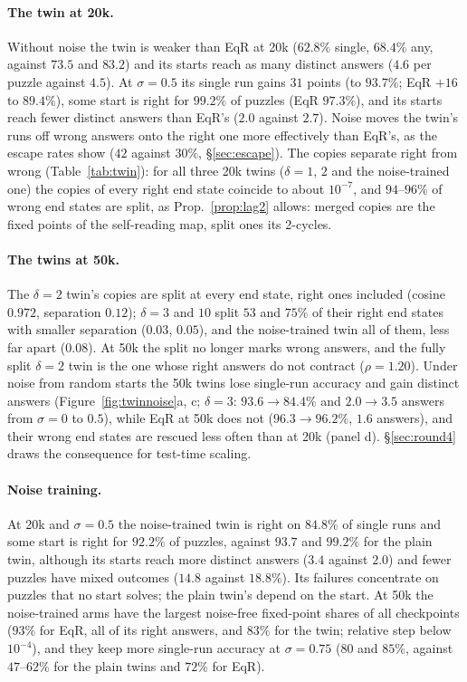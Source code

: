 \documentclass[11pt]{article}
\theoremstyle{definition}
\begin{document}
\paragraph{The twin at 20k.} Without noise the twin is weaker than EqR at 20k ($62.8\%$ single, $68.4\%$ any, against $73.5$ and $83.2$) and
its starts reach as many distinct answers ($4.6$ per puzzle against $4.5$). At $\sigma=0.5$ its single run gains $31$ points (to $93.7\%$; EqR
$+16$ to $89.4\%$), some start is right for $99.2\%$ of puzzles (EqR $97.3\%$), and its starts reach fewer distinct answers than EqR's ($2.0$
against $2.7$). Noise moves the twin's runs off wrong answers onto the right one more effectively than EqR's, as the escape rates show
($42$ against $30\%$, \S\ref{sec:escape}). The copies separate right from wrong (Table~\ref{tab:twin}): for all three 20k twins ($\delta=1$, $2$
and the noise-trained one) the copies of every right end state coincide to about $10^{-7}$, and $94$--$96\%$ of wrong end states are split,
as Prop.~\ref{prop:lag2} allows: merged copies are the fixed points of the self-reading map, split ones its 2-cycles.

\paragraph{The twins at 50k.} The $\delta=2$ twin's copies are split at every end state, right ones included (cosine $0.972$, separation $0.12$);
$\delta=3$ and $10$ split $53$ and $75\%$ of their right end states with smaller separation ($0.03$, $0.05$), and the noise-trained twin all of
them, less far apart ($0.08$). At 50k the split no longer marks wrong answers, and the fully split $\delta=2$ twin is the one whose right
answers do not contract ($\rho=1.20$). Under noise from random starts the 50k twins lose single-run accuracy and gain distinct answers
(Figure~\ref{fig:twinnoise}a, c; $\delta=3$: $93.6\to84.4\%$ and $2.0\to3.5$ answers from $\sigma=0$ to $0.5$), while EqR at 50k does not
($96.3\to96.2\%$, $1.6$ answers), and their wrong end states are rescued less often than at 20k (panel d). \S\ref{sec:round4} draws the
consequence for test-time scaling.

\paragraph{Noise training.} At 20k and $\sigma=0.5$ the noise-trained twin is right on $84.8\%$ of single runs and some start is right for
$92.2\%$ of puzzles, against $93.7$ and $99.2\%$ for the plain twin, although its starts reach more distinct answers ($3.4$ against $2.0$) and
fewer puzzles have mixed outcomes ($14.8$ against $18.8\%$). Its failures concentrate on puzzles that no start solves; the plain twin's
depend on the start. At 50k the noise-trained arms have the largest noise-free fixed-point shares of all checkpoints ($93\%$ for EqR,
all of its right answers, and $83\%$ for the twin; relative step below $10^{-4}$), and they keep more single-run accuracy at $\sigma=0.75$
($80$ and $85\%$, against $47$--$62\%$ for the plain twins and $72\%$ for EqR).
\end{document}
